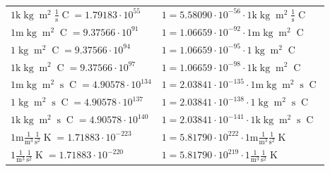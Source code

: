 \begin{center}
\begin{longtable}{l l}
{\color{gray}$1 \bm{\mathrm{ k}}\operatorname{kg}{\operatorname{m}^2}\frac1{\operatorname{s}}{\operatorname{C}}{} = 1.79183\cdot10^{55} $}   & {\color{gray}$ 1 = 5.58090\cdot10^{-56} \cdot 1 \bm{\mathrm{ k}}\operatorname{kg}{\operatorname{m}^2}\frac1{\operatorname{s}}{\operatorname{C}}{}$}  \\
{\color{gray}$1 \bm{\mathrm{ m}}\operatorname{kg}{\operatorname{m}^2}{}{\operatorname{C}}{} = 9.37566\cdot10^{91} $}   & {\color{gray}$ 1 = 1.06659\cdot10^{-92} \cdot 1 \bm{\mathrm{ m}}\operatorname{kg}{\operatorname{m}^2}{}{\operatorname{C}}{}$}  \\
{\color{black}$1 \bm{\mathrm{ }}\operatorname{kg}{\operatorname{m}^2}{}{\operatorname{C}}{} = 9.37566\cdot10^{94} $}   & {\color{black}$ 1 = 1.06659\cdot10^{-95} \cdot 1 \bm{\mathrm{ }}\operatorname{kg}{\operatorname{m}^2}{}{\operatorname{C}}{}$}  \\
{\color{gray}$1 \bm{\mathrm{ k}}\operatorname{kg}{\operatorname{m}^2}{}{\operatorname{C}}{} = 9.37566\cdot10^{97} $}   & {\color{gray}$ 1 = 1.06659\cdot10^{-98} \cdot 1 \bm{\mathrm{ k}}\operatorname{kg}{\operatorname{m}^2}{}{\operatorname{C}}{}$}  \\
{\color{gray}$1 \bm{\mathrm{ m}}\operatorname{kg}{\operatorname{m}^2}{\operatorname{s}}{\operatorname{C}}{} = 4.90578\cdot10^{134} $}   & {\color{gray}$ 1 = 2.03841\cdot10^{-135} \cdot 1 \bm{\mathrm{ m}}\operatorname{kg}{\operatorname{m}^2}{\operatorname{s}}{\operatorname{C}}{}$}  \\
{\color{black}$1 \bm{\mathrm{ }}\operatorname{kg}{\operatorname{m}^2}{\operatorname{s}}{\operatorname{C}}{} = 4.90578\cdot10^{137} $}   & {\color{black}$ 1 = 2.03841\cdot10^{-138} \cdot 1 \bm{\mathrm{ }}\operatorname{kg}{\operatorname{m}^2}{\operatorname{s}}{\operatorname{C}}{}$}  \\
{\color{gray}$1 \bm{\mathrm{ k}}\operatorname{kg}{\operatorname{m}^2}{\operatorname{s}}{\operatorname{C}}{} = 4.90578\cdot10^{140} $}   & {\color{gray}$ 1 = 2.03841\cdot10^{-141} \cdot 1 \bm{\mathrm{ k}}\operatorname{kg}{\operatorname{m}^2}{\operatorname{s}}{\operatorname{C}}{}$}  \\
\hline{\color{gray}$1 \bm{\mathrm{ m}}\frac1{\operatorname{m}^3}\frac1{\operatorname{s}^2}{}{\operatorname{K}} = 1.71883\cdot10^{-223} $}   & {\color{gray}$ 1 = 5.81790\cdot10^{222} \cdot 1 \bm{\mathrm{ m}}\frac1{\operatorname{m}^3}\frac1{\operatorname{s}^2}{}{\operatorname{K}}$}  \\
{\color{black}$1 \bm{\mathrm{ }}\frac1{\operatorname{m}^3}\frac1{\operatorname{s}^2}{}{\operatorname{K}} = 1.71883\cdot10^{-220} $}   & {\color{black}$ 1 = 5.81790\cdot10^{219} \cdot 1 \bm{\mathrm{ }}\frac1{\operatorname{m}^3}\frac1{\operatorname{s}^2}{}{\operatorname{K}}$}  \\

\end{longtable}
\end{center}
